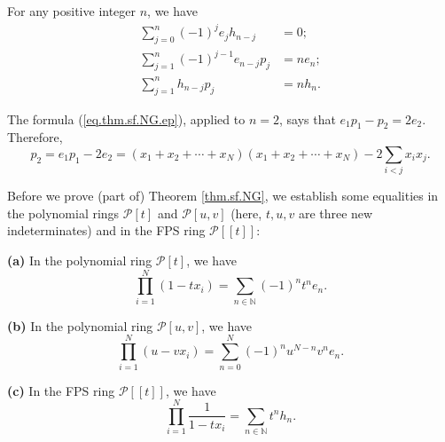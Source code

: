 \begin{theorem}
\label{thm.sf.NG}For any positive integer $n$, we
have%
\begin{align}
\sum_{j=0}^{n}\left(  -1\right)  ^{j}e_{j}h_{n-j}  &
=0;\label{eq.thm.sf.NG.eh}\\
\sum_{j=1}^{n}\left(  -1\right)  ^{j-1}e_{n-j}p_{j}  &  =ne_{n}%
;\label{eq.thm.sf.NG.ep}\\
\sum_{j=1}^{n}h_{n-j}p_{j}  &  =nh_{n}. \label{eq.thm.sf.NG.hp}%
\end{align}

\end{theorem}

\begin{example}
The formula (\ref{eq.thm.sf.NG.ep}), applied to $n=2$, says that $e_{1}%
p_{1}-p_{2}=2e_{2}$. Therefore,%
\[
p_{2}=e_{1}p_{1}-2e_{2}=\left(  x_{1}+x_{2}+\cdots+x_{N}\right)  \left(
x_{1}+x_{2}+\cdots+x_{N}\right)  -2\sum_{i<j}x_{i}x_{j}.
\]

\end{example}

Before we prove (part of) Theorem \ref{thm.sf.NG}, we establish some
equalities in the polynomial rings $\mathcal{P}\left[  t\right]  $ and
$\mathcal{P}\left[  u,v\right]  $ (here, $t,u,v$ are three new indeterminates)
and in the FPS ring $\mathcal{P}\left[  \left[  t\right]  \right]  $:

\begin{proposition}
\label{prop.sf.e-h-FPS}\textbf{(a)} In the polynomial ring $\mathcal{P}\left[
t\right]  $, we have%
\[
\prod_{i=1}^{N}\left(  1-tx_{i}\right)  =\sum_{n\in\mathbb{N}}\left(
-1\right)  ^{n}t^{n}e_{n}.
\]


\textbf{(b)} In the polynomial ring $\mathcal{P}\left[  u,v\right]  $, we have%
\[
\prod_{i=1}^{N}\left(  u-vx_{i}\right)  =\sum_{n=0}^{N}\left(  -1\right)
^{n}u^{N-n}v^{n}e_{n}.
\]


\textbf{(c)} In the FPS ring $\mathcal{P}\left[  \left[  t\right]  \right]  $,
we have%
\[
\prod_{i=1}^{N}\dfrac{1}{1-tx_{i}}=\sum_{n\in\mathbb{N}}t^{n}h_{n}.
\]

\end{proposition}

